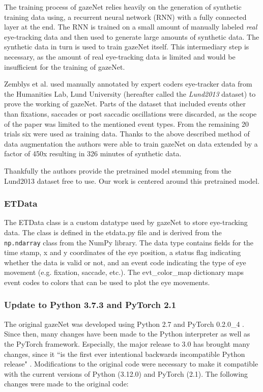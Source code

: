\documentclass[acmlarge]{acmart}
\begin{document}
The training process of gazeNet relies heavily on the generation of synthetic training data using, a recurrent neural network (RNN) with a fully connected layer at the end. The RNN is trained on a small amount of manually labeled \emph{real} eye-tracking data and then used to generate large amounts of synthetic data. The synthetic data in turn is used to train gazeNet itself. This intermediary step is necessary, as the amount of real eye-tracking data is limited and would be insufficient for the training of gazeNet. \cite{zemblys2018gazeNet}

Zemblys et al. \cite{zemblys2018gazeNet} used manually annotated by expert coders eye-tracker data from the Humanities Lab, Lund University (hereafter called the \emph{Lund2013} dataset) to prove the working of gazeNet. Parts of the dataset that included events other than fixations, saccades or post saccadic oscillations were discarded, as the scope of the paper was limited to the mentioned event types. From the remaining 20 trials six were used as training data. Thanks to the above described method of data augmentation the authors were able to train gazeNet on data extended by a factor of 450x resulting in 326 minutes of synthetic data.

Thankfully the authors provide the pretrained model stemming from the Lund2013 dataset free to use. Our work is centered around this pretrained model.


\subsubsection{ETData}
The ETData class is a custom datatype used by gazeNet to store eye-tracking data. The class is defined in the etdata.py file and is derived from the \verb|np.ndarray| class from the NumPy library. The data type contains fields for the time stamp, x and y coordinates of the eye position, a status flag indicating whether the data is valid or not, and an event code indicating the type of eye movement (e.g. fixation, saccade, etc.). The evt\_color\_map dictionary maps event codes to colors that can be used to plot the eye movements.


\subsubsection{Update to Python 3.7.3 and PyTorch 2.1}
The original gazeNet was developed using Python 2.7 and PyTorch 0.2.0\_4 \cite{zemblys2018gazeNet}. Since then, many changes have been made to the Python interpreter as well as the PyTorch framework. Especially, the major release to 3.0 has brought many changes, since it ``is the first ever intentional backwards incompatible Python release" \cite{van_Rossum_2009}. Modifications to the original code were necessary to make it compatible with the current versions of Python (3.12.0) and PyTorch (2.1). The following changes were made to the original code:
\end{document}

